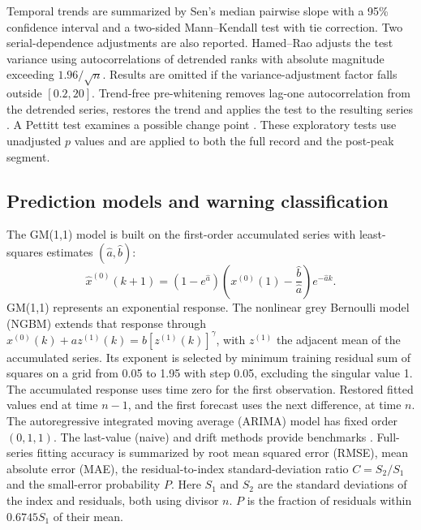 \documentclass[preprint,11pt,authoryear]{elsarticle}
\begin{document}
Temporal trends are summarized by Sen's median pairwise slope with a 95\% confidence interval \citep{sen1968slope} and a two-sided Mann--Kendall test with tie correction. Two serial-dependence adjustments are also reported. Hamed--Rao \citep{hamed1998modified} adjusts the test variance using autocorrelations of detrended ranks with absolute magnitude exceeding $1.96/\sqrt{n}$. Results are omitted if the variance-adjustment factor falls outside $[0.2,20]$. Trend-free pre-whitening removes lag-one autocorrelation from the detrended series, restores the trend and applies the test to the resulting series \citep{yue2002autocorrelation}. A Pettitt test examines a possible change point \citep{pettitt1979change}. These exploratory tests use unadjusted $p$ values and are applied to both the full record and the post-peak segment.

\subsection{Prediction models and warning classification}
\label{sec:warning}
The GM(1,1) model \citep{deng1982control} is built on the first-order accumulated series with least-squares estimates $(\hat a,\hat b)$:
\begin{equation}
\hat x^{(0)}(k+1)=\left(1-e^{\hat a}\right)\left(x^{(0)}(1)-\frac{\hat b}{\hat a}\right)e^{-\hat a k}.
\label{eq:gm}
\end{equation}
GM(1,1) represents an exponential response. The nonlinear grey Bernoulli model (NGBM) extends that response through $x^{(0)}(k)+az^{(1)}(k)=b[z^{(1)}(k)]^{\gamma}$, with $z^{(1)}$ the adjacent mean of the accumulated series. Its exponent is selected by minimum training residual sum of squares on a grid from 0.05 to 1.95 with step 0.05, excluding the singular value 1. The accumulated response uses time zero for the first observation. Restored fitted values end at time $n-1$, and the first forecast uses the next difference, at time $n$. The autoregressive integrated moving average (ARIMA) model has fixed order $(0,1,1)$. The last-value (naive) and drift methods provide benchmarks \citep{hyndman2021forecasting}. Full-series fitting accuracy is summarized by root mean squared error (RMSE), mean absolute error (MAE), the residual-to-index standard-deviation ratio $C=S_2/S_1$ and the small-error probability $P$. Here $S_1$ and $S_2$ are the standard deviations of the index and residuals, both using divisor $n$. $P$ is the fraction of residuals within $0.6745S_1$ of their mean.
\end{document}
